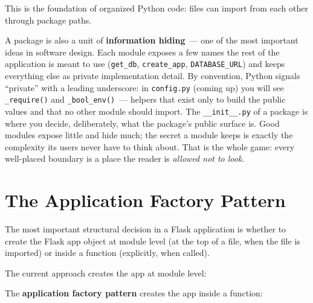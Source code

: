 \noindent{}This is the foundation of organized Python code: files can import from each other through package paths.

A package is also a unit of \textbf{information hiding}~--- one of the most important ideas in software design. Each module exposes a few names the rest of the application is meant to use (\texttt{get\_db}, \texttt{create\_app}, \texttt{DATABASE\_URL}) and keeps everything else as private implementation detail. By convention, Python signals ``private'' with a leading underscore: in \texttt{config.py} (coming up) you will see \texttt{\_require()} and \texttt{\_bool\_env()}~--- helpers that exist only to build the public values and that no other module should import. The \texttt{\_\_init\_\_.py} of a package is where you decide, deliberately, what the package's public surface is. Good modules expose little and hide much; the secret a module keeps is exactly the complexity its users never have to think about. That is the whole game: every well-placed boundary is a place the reader is \emph{allowed not to look}.

\setcounter{section}{3}
\section{The Application Factory Pattern}\label{15-structuring-the-application:154-the-application-factory-pattern}

The most important structural decision in a Flask application is whether to create the Flask app object at module level (at the top of a file, when the file is imported) or inside a function (explicitly, when called).

The current approach creates the app at module level:

\begin{codebox}[short]

\begin{Shaded}
\begin{Highlighting}[]
\OperatorTok{=}\NormalTok{)}
\end{Highlighting}
\end{Shaded}

\end{codebox}

\noindent{}The \textbf{application factory pattern} creates the app inside a function:

